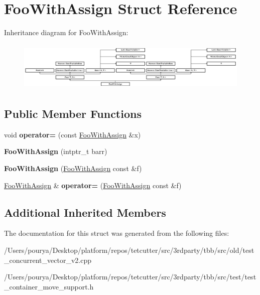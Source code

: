 \hypertarget{classFooWithAssign}{}\section{Foo\+With\+Assign Struct Reference}
\label{classFooWithAssign}
Inheritance diagram for Foo\+With\+Assign\+:\begin{figure}[H]
\begin{center}
\leavevmode
\includegraphics[height=2.364532cm]{classFooWithAssign}
\end{center}
\end{figure}
\subsection*{Public Member Functions}
\begin{DoxyCompactItemize}
\item 
\hypertarget{classFooWithAssign_a670e6a752dd0e0f8f1d40fc6b2f40500}{}void {\bfseries operator=} (const \hyperlink{classFooWithAssign}{Foo\+With\+Assign} \&x)\label{classFooWithAssign_a670e6a752dd0e0f8f1d40fc6b2f40500}

\item 
\hypertarget{classFooWithAssign_a33d3fab96956a246ebc60a2723241ec6}{}{\bfseries Foo\+With\+Assign} (intptr\+\_\+t barr)\label{classFooWithAssign_a33d3fab96956a246ebc60a2723241ec6}

\item 
\hypertarget{classFooWithAssign_a353a5c19759e18045a4c31ef62022c56}{}{\bfseries Foo\+With\+Assign} (\hyperlink{classFooWithAssign}{Foo\+With\+Assign} const \&f)\label{classFooWithAssign_a353a5c19759e18045a4c31ef62022c56}

\item 
\hypertarget{classFooWithAssign_a618f2b7e5b18b339da961c14e7a55efb}{}\hyperlink{classFooWithAssign}{Foo\+With\+Assign} \& {\bfseries operator=} (\hyperlink{classFooWithAssign}{Foo\+With\+Assign} const \&f)\label{classFooWithAssign_a618f2b7e5b18b339da961c14e7a55efb}

\end{DoxyCompactItemize}
\subsection*{Additional Inherited Members}


The documentation for this struct was generated from the following files\+:\begin{DoxyCompactItemize}
\item 
/\+Users/pourya/\+Desktop/platform/repos/tetcutter/src/3rdparty/tbb/src/old/test\+\_\+concurrent\+\_\+vector\+\_\+v2.\+cpp\item 
/\+Users/pourya/\+Desktop/platform/repos/tetcutter/src/3rdparty/tbb/src/test/test\+\_\+container\+\_\+move\+\_\+support.\+h\end{DoxyCompactItemize}
